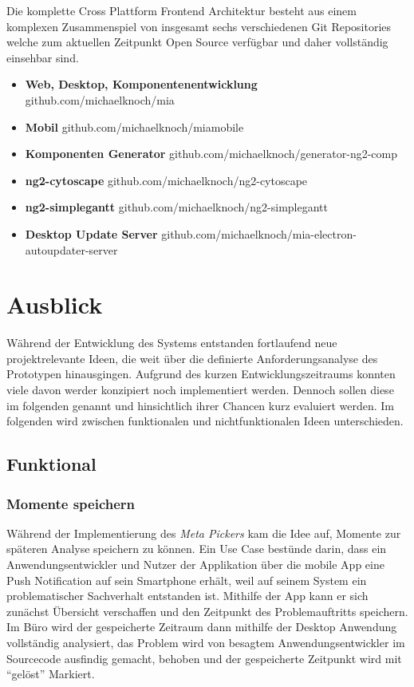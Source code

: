 Die komplette Cross Plattform Frontend Architektur besteht aus einem komplexen Zusammenspiel von insgesamt sechs verschiedenen Git Repositories
welche zum aktuellen Zeitpunkt Open Source verfügbar und daher vollständig einsehbar sind.

\begin{itemize}
  \item{\textbf{Web, Desktop, Komponentenentwicklung} github.com/michaelknoch/mia}
  \item{\textbf{Mobil} github.com/michaelknoch/miamobile}
  \item{\textbf{Komponenten Generator} github.com/michaelknoch/generator-ng2-comp}
  \item{\textbf{ng2-cytoscape} github.com/michaelknoch/ng2-cytoscape}
  \item{\textbf{ng2-simplegantt} github.com/michaelknoch/ng2-simplegantt}
  \item{\textbf{Desktop Update Server} github.com/michaelknoch/mia-electron-autoupdater-server}
\end{itemize}



\section{Ausblick}

Während der Entwicklung des Systems entstanden fortlaufend neue projektrelevante Ideen,
die weit über die definierte Anforderungsanalyse des Prototypen hinausgingen.
Aufgrund des kurzen Entwicklungszeitraums konnten viele davon werder konzipiert noch implementiert werden.
Dennoch sollen diese im folgenden genannt und hinsichtlich ihrer Chancen kurz evaluiert werden.
Im folgenden wird zwischen funktionalen und nichtfunktionalen Ideen unterschieden.

\subsection{Funktional}

\subsubsection{Momente speichern}

Während der Implementierung des \emph{Meta Pickers} kam die Idee auf, Momente zur späteren Analyse speichern zu können.
Ein Use Case bestünde darin, dass ein Anwendungsentwickler und Nutzer der Applikation \projectname{}
über die mobile App eine Push Notification auf sein Smartphone erhält, weil auf seinem System ein problematischer Sachverhalt
entstanden ist. Mithilfe der App kann er sich zunächst Übersicht verschaffen und den Zeitpunkt des Problemauftritts speichern.
Im Büro wird der gespeicherte Zeitraum dann mithilfe der Desktop Anwendung vollständig analysiert,
das Problem wird von besagtem Anwendungsentwickler im Sourcecode ausfindig gemacht, behoben und der gespeicherte Zeitpunkt wird mit ``gelöst'' Markiert.

